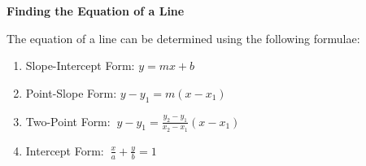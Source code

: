\begin{center}
\textbf{Finding the Equation of a Line 
}
\end{center}

\vspce

The equation of a line can be determined using  the following formulae: 
\begin{enumerate}[label = \arabic*. ]
\item  Slope-Intercept Form: ${y  =  mx  +  b}$
\vspce 
\item  Point-Slope Form: ${y  -  y_1  =  m(x  -  x_1)}$
\vspce 
\item Two-Point Form: $\ { y  -  y_1  = \displaystyle  \frac{y_2 - y_1}{x_2 - x_1}(x  -  x_1)}$
\vspce 
\item Intercept Form: $\ {\displaystyle  \frac{x}{a}+\displaystyle  \frac{y}{b}=1 }$ 
 
\end{enumerate}  


